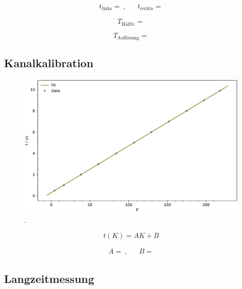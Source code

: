 \begin{align*}
	t_\text{links} =  \: , && t_\text{rechts} = 
\end{align*}

\begin{equation*}
	T_\text{Hälfte} = 
\end{equation*}

\begin{equation*}
	T_\text{Auflösung} = 
\end{equation*}



\subsection{Kanalkalibration}

\begin{figure}[H]
	\centering
	\includegraphics[width=\textwidth]{build/calibration.pdf}
	\caption{.}
	\label{fig:calibration}
\end{figure}

\begin{equation*}
	t(K) = AK + B
\end{equation*}

\begin{align*}
	A =  \: , && B = 
\end{align*}



\subsection{Langzeitmessung}


